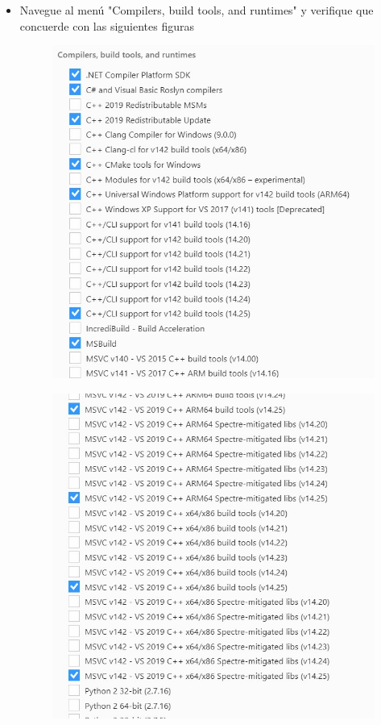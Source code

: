\documentclass[letterpaper,12pt]{article}
\begin{document}
\begin{itemize}
		\item  Navegue al menú "Compilers, build tools, and runtimes" y verifique que concuerde con las siguientes figuras
		
		\begin{figure}[H]
			\centering
			\includegraphics[width=0.7\linewidth]{images/Visual3}
			\label{fig:visual3}
		\end{figure}
	\begin{figure}[H]
		\centering
		\includegraphics[width=0.7\linewidth]{images/Visual4}
		\label{fig:visual4}
	\end{figure}
	

			
	\end{itemize}  	
\end{document}
